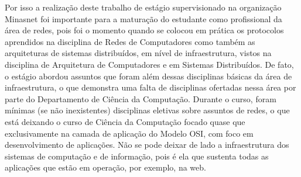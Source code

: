     Por isso a realização deste trabalho de estágio supervisionado na organização Minasnet foi importante para a maturação do estudante como profissional da área de redes, pois foi o momento quando se colocou em prática os protocolos aprendidos na disciplina de Redes de Computadores como também as arquiteturas de sistemas distribuídos, em nível de infraestrutura, vistos na disciplina de Arquitetura de Computadores e em Sistemas Distribuídos. De fato, o estágio abordou assuntos que foram além dessas disciplinas básicas da área de infraestrutura, o que demonstra uma falta de disciplinas ofertadas nessa área por parte do Departamento de Ciência da Computação. Durante o curso, foram mínimas (se não inexistentes) disciplinas eletivas sobre assuntos de redes, o que está deixando o curso de Ciência da Computação focado quase que exclusivamente na camada de aplicação do Modelo OSI, com foco em desenvolvimento de aplicações. Não se pode deixar de lado a infraestrutura dos sistemas de computação e de informação, pois é ela que sustenta todas as aplicações que estão em operação, por exemplo, na web.
    